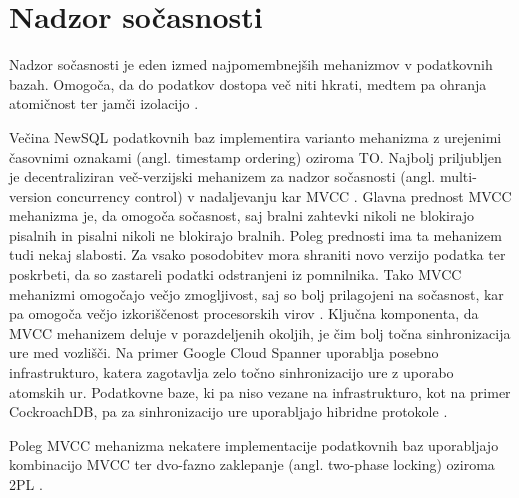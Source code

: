 \documentclass[a4paper, 12pt]{book}
\begin{document}
\section{Nadzor sočasnosti}
\label{newsql/concurrencycontroll}
Nadzor sočasnosti je eden izmed najpomembnejših mehanizmov v podatkovnih bazah. Omogoča, da do podatkov dostopa več niti hkrati, medtem pa ohranja atomičnost ter jamči izolacijo \cite{Pavlo2016Sep}.

Večina NewSQL podatkovnih baz implementira varianto mehanizma z urejenimi časovnimi oznakami (angl. timestamp ordering) oziroma TO. Najbolj priljubljen je decentraliziran več-verzijski mehanizem za nadzor so\-čas\-no\-sti (angl. multi-version concurrency control) v nadaljevanju kar MVCC \cite{Pavlo2016Sep}.
Glavna prednost MVCC mehanizma je, da omogoča sočasnost, saj bralni zahtevki nikoli ne blokirajo pisalnih in pisalni nikoli ne blokirajo bralnih. Poleg prednosti ima ta mehanizem tudi nekaj slabosti. Za vsako posodobitev mora shraniti novo verzijo podatka ter poskrbeti, da so zastareli podatki odstranjeni iz pomnilnika. Tako MVCC mehanizmi omogočajo večjo zmogljivost, saj so bolj prilagojeni na sočasnost, kar pa omogoča večjo izkoriščenost procesorskih virov \cite{MainMemoryDatabaseSystems}. Ključna komponenta, da MVCC mehanizem deluje v porazdeljenih okoljih, je čim bolj točna sinhronizacija ure med vozlišči. Na primer Google Cloud Spanner uporablja posebno infrastrukturo, katera zagotavlja zelo točno sinhronizacijo ure z uporabo atomskih ur. Podatkovne baze, ki pa niso vezane na infrastrukturo, kot na primer CockroachDB, pa za sinhronizacijo ure uporabljajo hibridne protokole \cite{Pavlo2016Sep}.

Poleg MVCC mehanizma nekatere implementacije podatkovnih baz uporabljajo kombinacijo MVCC ter dvo-fazno zaklepanje (angl. two-phase locking) oziroma 2PL \cite{Pavlo2016Sep, MainMemoryDatabaseSystems}.

\newpage
\end{document}
